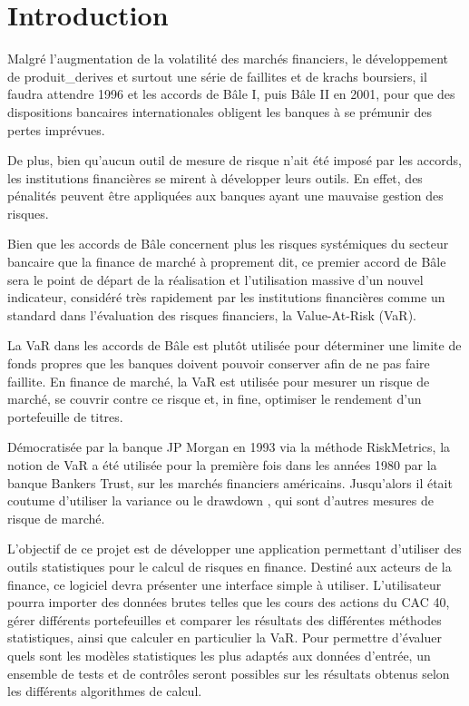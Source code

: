 \chapter{Introduction} 

	Malgré l'augmentation de la volatilité des marchés financiers, le développement de \glspl{produit_derive}\nocite{website:produitDerive} et surtout une série de faillites et de krachs boursiers, il faudra attendre 1996 et les accords de Bâle I, puis Bâle II en 2001, pour que des dispositions bancaires internationales obligent les banques à se prémunir des pertes imprévues.

De plus, bien qu'aucun outil de mesure de risque n'ait été imposé par les accords, les institutions financières se mirent à développer leurs outils. En effet, des pénalités peuvent être appliquées aux banques ayant une mauvaise gestion des risques.

Bien que les accords de Bâle concernent plus les risques systémiques du secteur bancaire que la finance de marché à proprement dit, ce premier accord de Bâle sera le point de départ de la réalisation et l'utilisation massive d'un nouvel indicateur, considéré très rapidement par les institutions financières comme un standard dans l'évaluation des risques financiers, la Value-At-Risk (VaR).

La VaR dans les accords de Bâle est plutôt utilisée pour déterminer une limite de fonds propres que les banques doivent pouvoir conserver afin de ne pas faire faillite. En finance de marché, la VaR est utilisée pour mesurer un risque de marché, se couvrir contre ce risque et, in fine, optimiser le rendement d'un portefeuille de titres.

Démocratisée par la banque JP Morgan en 1993 via la méthode RiskMetrics, la notion de VaR a été utilisée pour la première fois dans les années 1980 par la banque Bankers Trust, sur les marchés financiers américains. Jusqu'alors il était coutume d'utiliser la variance ou le \gls{drawdown} \nocite{website:drawdown}, qui sont d'autres mesures de risque de marché.

L'objectif de ce projet est de développer une application permettant d'utiliser des outils statistiques pour le calcul de risques en finance. Destiné aux acteurs de la finance, ce logiciel devra présenter une interface simple à utiliser. L'utilisateur pourra importer des données brutes telles que les cours des actions du CAC 40, gérer différents portefeuilles et comparer les résultats des différentes méthodes statistiques, ainsi que calculer en particulier la VaR. Pour permettre d'évaluer quels sont les modèles statistiques les plus adaptés aux données d'entrée, un ensemble de tests et de contrôles seront possibles sur les résultats obtenus selon les différents algorithmes de calcul.

